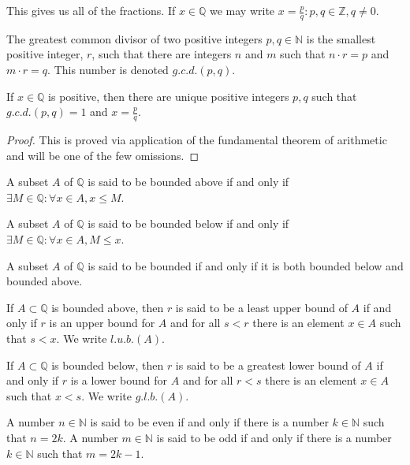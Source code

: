 \documentclass[crop=false,class=article,oneside]{standalone}
\begin{document}
    \begin{remark}
    This gives us all of the fractions. If $x\in \mathbb{Q}$ we may write $x= \frac{p}{q}:p,q\in \mathbb{Z}, q\ne 0$.
    \end{remark}
    \begin{definition}
    The greatest common divisor of two positive integers $p,q\in \mathbb{N}$ is the smallest positive integer, $r$, such that there are integers $n$ and $m$ such that $n\cdot r = p$ and $m\cdot r = q$. This number is denoted $g.c.d.(p,q)$.
    \end{definition}
    \begin{theorem}
    If $x\in \mathbb{Q}$ is positive, then there are unique positive integers $p, q$ such that $g.c.d.(p,q)=1$ and $x=\frac{p}{q}$.
    \end{theorem}
    \begin{proof}
    This is proved via application of the fundamental theorem of arithmetic and will be one of the few omissions.
    \end{proof}
    \begin{definition}
    A subset $A$ of $\mathbb{Q}$ is said to be bounded above if and only if $\exists M\in \mathbb{Q}: \forall x\in A,x \leq M$.
    \end{definition}
    \begin{definition}
    A subset $A$ of $\mathbb{Q}$ is said to be bounded below if and only if $\exists M\in \mathbb{Q}:\forall x\in A,M\leq x$. 
    \end{definition}
    \begin{definition}
    A subset $A$ of $\mathbb{Q}$ is said to be bounded if and only if it is both bounded below and bounded above.
    \end{definition}
    \begin{definition}
    If $A\subset \mathbb{Q}$ is bounded above, then $r$ is said to be a least upper bound of $A$ if and only if $r$ is an upper bound for $A$ and for all $s<r$ there is an element $x\in A$ such that $s<x$. We write $l.u.b.(A)$.
    \end{definition}
    \begin{definition}
    If $A\subset \mathbb{Q}$ is bounded below, then $r$ is said to be a greatest lower bound of $A$ if and only if $r$ is a lower bound for $A$ and for all $r<s$ there is an element $x\in A$ such that $x<s$. We write $g.l.b.(A)$.
    \end{definition}
    \begin{definition}
    A number $n\in \mathbb{N}$ is said to be even if and only if there is a number $k\in \mathbb{N}$ such that $n=2k$. A number $m\in \mathbb{N}$ is said to be odd if and only if there is a number $k\in \mathbb{N}$ such that $m=2k-1$.
    \end{definition}
\end{document}
